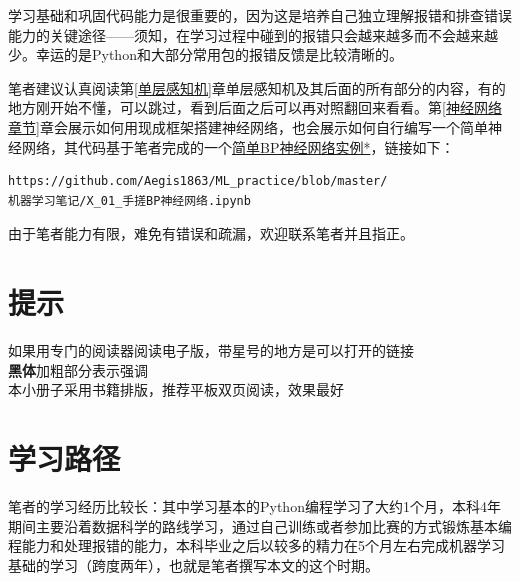\documentclass[a5paper, 11pt]{ctexbook}
\begin{document}
学习基础和巩固代码能力是很重要的，因为这是培养自己独立理解报错和排查错误能力的关键途径——须知，在学习过程中碰到的报错只会越来越多而不会越来越少。幸运的是Python和大部分常用包的报错反馈是比较清晰的。

笔者建议认真阅读第\ref{单层感知机}章单层感知机及其后面的所有部分的内容，有的地方刚开始不懂，可以跳过，看到后面之后可以再对照翻回来看看。第\ref{神经网络章节}章会展示如何用现成框架搭建神经网络，也会展示如何自行编写一个简单神经网络，其代码基于笔者完成的一个\href{https://github.com/Aegis1863/ML_practice/blob/master/机器学习笔记/X_01_手搓BP神经网络.ipynb}{简单BP神经网络实例*}，链接如下：
\begin{verbatim}
https://github.com/Aegis1863/ML_practice/blob/master/
机器学习笔记/X_01_手搓BP神经网络.ipynb
\end{verbatim}\label{代码链接}


由于笔者能力有限，难免有错误和疏漏，欢迎联系笔者并且指正。

\section*{提示}
\begin{center}
    如果用专门的阅读器阅读电子版，带星号的地方是可以打开的链接 \\
    \textbf{黑体}加粗部分表示强调 \\
    本小册子采用书籍排版，推荐平板双页阅读，效果最好
\end{center}

\section*{学习路径}

\begin{sloppypar} %
笔者的学习经历比较长：其中学习基本的Python编程学习了大约1个月，本科4年期间主要沿着数据科学的路线学习，通过自己训练或者参加比赛的方式锻炼基本编程能力和处理报错的能力，本科毕业之后以较多的精力在5个月左右完成机器学习基础的学习（跨度两年），也就是笔者撰写本文的这个时期。
\end{sloppypar}
\end{document}
